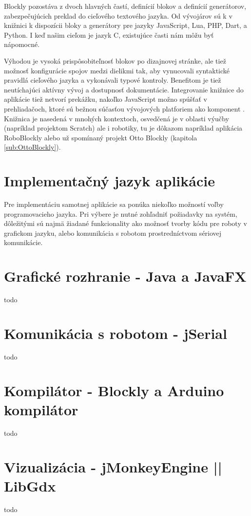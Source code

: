 Blockly pozostáva z dvoch hlavných častí, definícií blokov a definícií generátorov, zabezpečujúcich preklad do cieľového textového jazyka. Od vývojárov sú k v knižnici k dispozícii  bloky a generátory pre jazyky JavaScript, Lua, PHP, Dart, a Python. I keď našim cieľom je jazyk C, existujúce časti nám môžu byť nápomocné.

Výhodou je vysoká prispôsobiteľnosť blokov po dizajnovej stránke, ale tiež možnosť konfigurácie spojov medzi dielikmi tak, aby vynucovali syntaktické pravidlá cieľového jazyka a vykonávali typové kontroly. Benefitom je tiež neutíchajúci aktívny vývoj a dostupnosť dokumentácie. Integrovanie knižnice do aplikácie tiež netvorí prekážku, nakoľko JavaScript možno spúšťať v prehliadačoch, ktoré sú bežnou súčasťou vývojových platforiem ako komponent . Knižnica je nasedená v mnohých kontextoch, osvedčená je v oblasti výučby (napríklad projektom Scratch) ale i robotiky, tu je dôkazom napríklad aplikácia RoboBlockly alebo už spomínaný projekt Otto Blockly (kapitola \ref{sub:OttoBlockly}).

\section{Implementačný jazyk aplikácie}
Pre implementáciu samotnej aplikácie sa ponúka niekoľko možností voľby programovacieho jazyka. Pri výbere je nutné zohľadniť požiadavky na systém, dôležitými sú najmä žiadané funkcionality ako možnosť tvorby kódu pre roboty v grafickom jazyku, alebo komunikácia s robotom prostredníctvom sériovej komunikácie. 

\section{Grafické rozhranie - Java a JavaFX}
todo



\section{Komunikácia s robotom - jSerial}
todo

\section{Kompilátor - Blockly a Arduino kompilátor}
todo

\section{Vizualizácia - jMonkeyEngine || LibGdx}
todo

